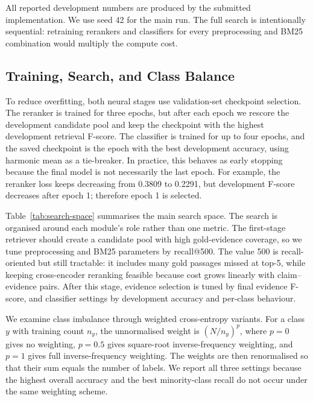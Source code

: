 \documentclass[11pt]{article}
\begin{document}
All reported development numbers are produced by the submitted implementation. We use seed 42 for the main run. The full search is intentionally sequential: retraining rerankers and classifiers for every preprocessing and BM25 combination would multiply the compute cost.


\subsection{Training, Search, and Class Balance}

To reduce overfitting, both neural stages use validation-set checkpoint selection. The reranker is trained for three epochs, but after each epoch we rescore the development candidate pool and keep the checkpoint with the highest development retrieval F-score. The classifier is trained for up to four epochs, and the saved checkpoint is the epoch with the best development accuracy, using harmonic mean as a tie-breaker. In practice, this behaves as early stopping because the final model is not necessarily the last epoch. For example, the reranker loss keeps decreasing from 0.3809 to 0.2291, but development F-score decreases after epoch 1; therefore epoch 1 is selected.

Table~\ref{tab:search-space} summarises the main search space. The search is organised around each module's role rather than one metric. The first-stage retriever should create a candidate pool with high gold-evidence coverage, so we tune preprocessing and BM25 parameters by recall@500. The value 500 is recall-oriented but still tractable: it includes many gold passages missed at top-5, while keeping cross-encoder reranking feasible because cost grows linearly with claim--evidence pairs. After this stage, evidence selection is tuned by final evidence F-score, and classifier settings by development accuracy and per-class behaviour.

We examine class imbalance through weighted cross-entropy variants. For a class $y$ with training count $n_y$, the unnormalised weight is $(N/n_y)^p$, where $p=0$ gives no weighting, $p=0.5$ gives square-root inverse-frequency weighting, and $p=1$ gives full inverse-frequency weighting. The weights are then renormalised so that their sum equals the number of labels. We report all three settings because the highest overall accuracy and the best minority-class recall do not occur under the same weighting scheme.
\end{document}
